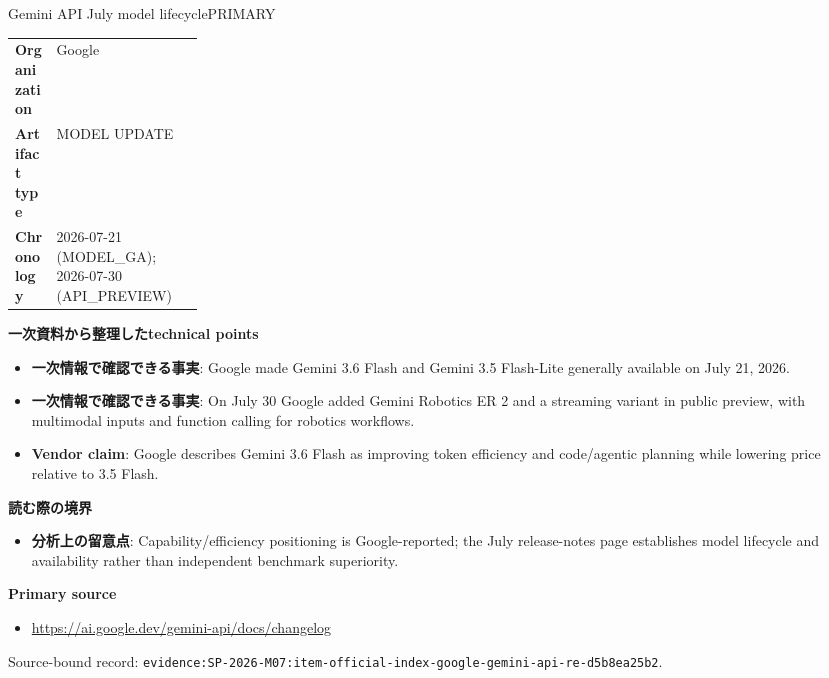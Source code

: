 \begin{technicalnote}{Gemini API July model lifecycle}{PRIMARY}
\begin{tabularx}{\linewidth}{@{}>{\bfseries}p{0.22\linewidth}X@{}}
Organization & Google \\
Artifact type & MODEL UPDATE \\
Chronology & 2026-07-21 (MODEL\_GA); 2026-07-30 (API\_PREVIEW) \\
\end{tabularx}
\smallskip
{\bfseries 一次資料から整理したtechnical points}
\begin{itemize}[leftmargin=1.5em,itemsep=0.35em]
\item \textbf{一次情報で確認できる事実}: Google made Gemini 3.6 Flash and Gemini 3.5 Flash-Lite generally available on July 21, 2026.
\item \textbf{一次情報で確認できる事実}: On July 30 Google added Gemini Robotics ER 2 and a streaming variant in public preview, with multimodal inputs and function calling for robotics workflows.
\item \textbf{Vendor claim}: Google describes Gemini 3.6 Flash as improving token efficiency and code/agentic planning while lowering price relative to 3.5 Flash.
\end{itemize}
{\bfseries 読む際の境界}
\begin{itemize}[leftmargin=1.5em,itemsep=0.35em]
\item \textbf{分析上の留意点}: Capability/efficiency positioning is Google-reported; the July release-notes page establishes model lifecycle and availability rather than independent benchmark superiority.
\end{itemize}
{\bfseries Primary source}
\begingroup\sloppy
\begin{itemize}[leftmargin=1.5em,itemsep=0.25em]
\item {\scriptsize\url{https://ai.google.dev/gemini-api/docs/changelog}}
\end{itemize}
\endgroup
{\scriptsize\color{SurveyMuted}Source-bound record: \texttt{evidence:SP-2026-M07:item-official-index-google-gemini-api-re-d5b8ea25b2}.}
\end{technicalnote}
\medskip

